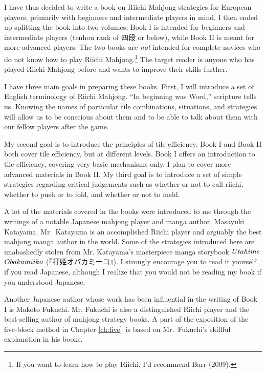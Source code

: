 \bigskip
I have thus decided to write a book on Riichi Mahjong strategies for European players, primarily with beginners and intermediate players in mind. I then ended up splitting the book into two volumes; Book I is intended for beginners and intermediate players ({\jap tenhou} rank of 四段 or below), while Book II is meant for more advanced players. The two books are \emph{not} intended for complete novices who do not know how to play Riichi Mahjong.\footnote{If you want to learn how to play Riichi, I'd recommend Barr (2009).} The target reader is anyone who has played Riichi Mahjong before and wants to improve their skills further. 

\bigskip
I have three main goals in preparing these books. First, I will introduce a set of English terminology of Riichi Mahjong. 
``In beginning was Word,'' scripture tells us. Knowing the names of particular tile combinations, situations, and strategies will allow us to be conscious about them and to be able to talk about them with our fellow players after the game. 

\bigskip
My second goal is to introduce the principles of tile efficiency. 
Book I and Book II both cover tile efficiency, but at different levels. Book I offers an introduction to tile efficiency, covering very basic mechanisms only. I plan to cover more advanced materials in Book II. 
My third goal is to introduce a set of simple strategies regarding critical judgements such as whether or not to call {\jap riichi}, whether to push or to fold, and whether or not to meld.

\bigskip
A lot of the materials covered in the books were introduced to me through the writings of a notable Japanese mahjong player and manga author, Masa\-yuki Kata\-yama. Mr.~Kata\-yama is an accomplished Riichi player and arguably the best mahjong manga author in the world. Some of the strategies introduced here are unabashedly stolen from Mr. Kata\-yama's masterpiece manga storybook $Uta\-hime$ $Obaka\-miiko$ (『打姫\-オバカ\-ミーコ』). 
I strongly encourage you to read it yourself if you read Japanese, although I realize that you would not be reading my book if you understood Japanese.

\bigskip
Another Japanese author whose work has been influential in the writing of Book I is Makoto Fukuchi. Mr. Fukuchi is also a distinguished Riichi player and the best-selling author of mahjong strategy books. A part of the exposition of the five-block method in Chapter \ref{ch:five}~is based on Mr.~Fukuchi's skillful explanation in his books. 

